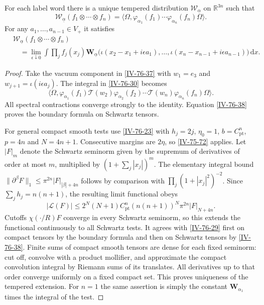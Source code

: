 \documentclass[11pt,letterpaper,reqno]{amsart}
\makeatletter
\theoremstyle{definition}
\newcommand{\ms@minorstart}{%
  \pushQED{\qed}\renewcommand{\qedsymbol}{$\blacksquare$}}
\newenvironment{proposition}[1][]{\ms@minorstart\ms@proposition[#1]}
  {\popQED\endms@proposition}
\theoremstyle{remark}
\makeatother
\begin{document}
\begin{proposition}[Vacuum boundary distributions]
\label{prop:iv-wightman-distributions}
For each label word there is a unique tempered distribution
$\mathcal W_{\underline\alpha}$ on $\mathbb R^{3n}$ such that
\begin{equation}\label{IV-76-29}
 \mathcal W_{\underline\alpha}(f_1\otimes\cdots\otimes f_n)
       =\langle\Omega,\varphi_{\alpha_1}(f_1)\cdots
                                   \varphi_{\alpha_n}(f_n)\Omega\rangle.
\end{equation}
For any $a_1,\ldots,a_{n-1}\in V_+$ it satisfies
\begin{equation}\label{IV-76-30}
 \begin{split}
 &\mathcal W_{\underline\alpha}(f_1\otimes\cdots\otimes f_n)\\
 &\quad=\lim_{\epsilon\downarrow0}\int\prod_jf_j(x_j)
 \mathbf W_{\underline\alpha}\bigl(
       \iota(x_2-x_1+i\epsilon a_1),\ldots,
       \iota(x_n-x_{n-1}+i\epsilon a_{n-1})\bigr)\,\mathrm{d}x.
 \end{split}
\end{equation}
\end{proposition}
\begin{proof}
Take the vacuum component in \eqref{IV-76-37} with
$w_1=e_3$ and $w_{j+1}=\iota(i\epsilon a_j)$.
The integral in \eqref{IV-76-30} becomes
\[
 \langle\Omega,\varphi_{\alpha_1}(f_1)\mathcal T(w_2)
       \varphi_{\alpha_2}(f_2)\cdots
                       \mathcal T(w_n)\varphi_{\alpha_n}(f_n)\Omega\rangle.
\]
All spectral contractions converge strongly to the identity.
Equation \eqref{IV-76-38} proves the boundary formula on
Schwartz tensors.

For general compact smooth tests use \cref{IV-76-23} with
$h_j=2j$, $\eta_0=1$, $b=C_{\mathrm{pt}}^n$,
$p=4n$ and $N=4n+1$. Consecutive margins are $2\eta$,
so \eqref{IV-75-72} applies. Let $|F|_m$ denote the Schwartz
seminorm given by the supremum of derivatives of order at
most $m$, multiplied by $(1+\sum_j|x_j|)^m$.
The elementary integral bound
$\|\partial^\beta F\|_1\le\pi^{2n}|F|_{|\beta|+4n}$
follows by comparison with
$\prod_j(1+|x_j|^2)^{-2}$. Since
$\sum_jh_j=n(n+1)$, the resulting limit functional obeys
\[
 |\mathcal L(F)|\le
 2^N(N+1)C_{\mathrm{pt}}^n(n(n+1))^N\pi^{2n}|F|_{N+4n}.
\]
Cutoffs $\chi(\cdot/R)F$ converge in every Schwartz seminorm,
so this extends the functional continuously to all Schwartz
tests. It agrees with \eqref{IV-76-29} first on compact
tensors by the boundary formula and then on Schwartz tensors
by \eqref{IV-76-38}. Finite sums of compact smooth tensors
are dense for each fixed seminorm: cut off, convolve with a
product mollifier, and approximate the compact convolution
integral by Riemann sums of its translates. All derivatives
up to that order converge uniformly on a fixed compact set.
This proves uniqueness of the tempered extension.
For $n=1$ the same assertion is simply the constant
$\mathbf W_{\alpha_1}$ times the integral of the test.
\end{proof}
\end{document}
